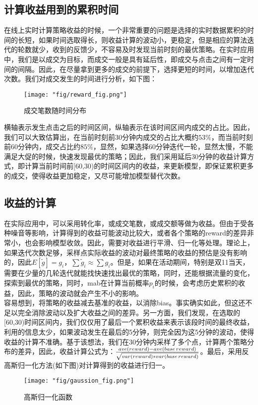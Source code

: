 \subsection{计算收益用到的累积时间}
在线上实时计算策略收益的时候，一个非常重要的问题是选择的实时数据累积的时间的长短，如果时间选取得长，则收益计算的波动小，更稳定，但是相应的算法迭代的轮数就少，收到的反馈少，不容易及时发现当前时刻的最优策略。在实时应用中，我们是以成交为目标，而成交一般是具有延后性，即成交与点击之间有一定时间的间隔。因此，在尽量拿到更多的成交的前提下，选择更短的时间，以增加迭代次数。我们对成交发生的时间进行分析，如下图：
\begin{figure}[h]
\centering
\texttt{[image: "fig/reward\_fig.png"]}
\caption{成交笔数随时间分布}
\label{fig:reward}
\end{figure}
横轴表示发生点击之后的时间区间，纵轴表示在该时间区间内成交的占比。因此，我们可以大致估算出，在当前时刻前30分钟内成交的占比大概约$53\%$，而当前时刻前60分钟内，成交占比约$85\%$，显然，如果选择60分钟迭代一轮，显然太慢，不能满足大促的时候，快速发现最优的策略；因此，我们采用延后30分钟的收益计算方式，即计算当前时间前[60,30)的时间区间内的收益，来更新模型，即保证累积更多的成交，使得收益更加稳定，又尽可能增加模型替代次数。
\subsection{收益的计算}
在实际应用中，可以采用转化率，或成交笔数，或成交额等做为收益。但由于受各种噪音等影响，计算得到的收益可能波动比较大，或者各个策略的reward的差异非常小，也会影响模型收敛。因此，需要对收益进行平滑、归一化等处理。理论上，如果迭代次数足够，采样点实际收益的波动对最终策略的收益的预估是没有影响的，因此$E[\widetilde{g}]=g_i$，$\sum{\widetilde{g}_i} \approx \sum{g_i}$。但是，如果在活动期间，特别是双11当天，需要在少量的几轮迭代就能找快速找出最优的策略，同时，还能根据流量的变化，探索到最优的策略，同时，mab在计算当前概率$p_i$的时候，会考虑历史累积的收益，因此，策略的波动就会产生不小的影响。\\
容易想到，将策略的收益减去基准的收益，以消除bias。事实确实如此，但这还不足以完全消除波动以及扩大收益之间的差异。另一方面，我们发现，在选取的[60,30)时间区间内，我们仅仅用了最后一个累积收益来表示该段时间的最终收益，利用的信息太少，如果波动发生在最后的5分钟，则完全因为这5分钟的波动，使得收益的计算不准确。基于该想法，我们在30分钟内采样了多个点，计算两个策略分布的差异，因此，收益计算公式为：$\frac{ave(reward)-ave(base\hspace*{0.02in}reward)}{\sqrt{var(reward)*var(base\hspace*{0.02in}reward)}}$。最后，采用反高斯归一化方法(如下图)对计算得到的收益进行归一。
\begin{figure}[h]
\centering
\texttt{[image: "fig/gaussion\_fig.png"]}
\caption{高斯归一化函数}
\label{fig:gaussion}
\end{figure}

